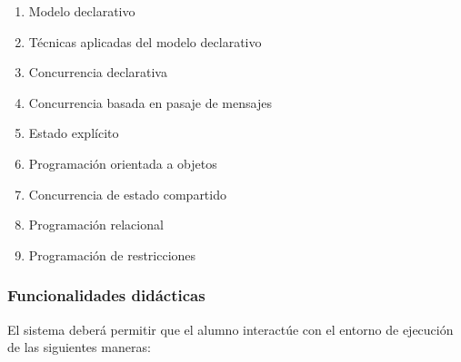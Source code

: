 \documentclass[a4paper,11pt]{article}
\begin{document}
\begin{enumerate}

  \item Modelo declarativo \cite[cap.2]{ctmcp}

  \item Técnicas aplicadas del modelo declarativo \cite[cap.3]{ctmcp}

  \item Concurrencia declarativa \cite[cap.4]{ctmcp}

  \item Concurrencia basada en pasaje de mensajes \cite[cap.5]{ctmcp}

  \item Estado explícito \cite[cap.6]{ctmcp}

  \item Programación orientada a objetos \cite[cap.7]{ctmcp}

  \item Concurrencia de estado compartido \cite[cap.8]{ctmcp}

  \item Programación relacional \cite[cap.9]{ctmcp}

  \item Programación de restricciones \cite[cap.12]{ctmcp}

\end{enumerate}

\subsubsection{Funcionalidades didácticas}

El sistema deberá permitir que el alumno interactúe con el entorno de ejecución
de las siguientes maneras:
\end{document}
